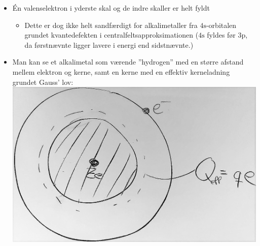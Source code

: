 \begin{itemize}
    \item Én valenselektron i yderste skal og de indre skaller er helt fyldt
    \begin{itemize}
        \item Dette er dog ikke helt sandfærdigt for alkalimetaller fra $4\text{s}$-orbitalen grundet kvantedefekten i centralfeltsapproksimationen ($4\text{s}$ fyldes før $3\text{p}$, da førstnævnte ligger lavere i energi end sidstnævnte.)
    \end{itemize}
    \item Man kan se et alkalimetal som værende ''hydrogen'' med en større afstand mellem elektron og kerne, samt en kerne med en effektiv kerneladning grundet Gauss' lov:\\
    
    \includegraphics[width=.8\textwidth]{Q14/images/AlkaliSomHydrogenMedEffektivKerneladning.png}
\end{itemize}
\normalsize